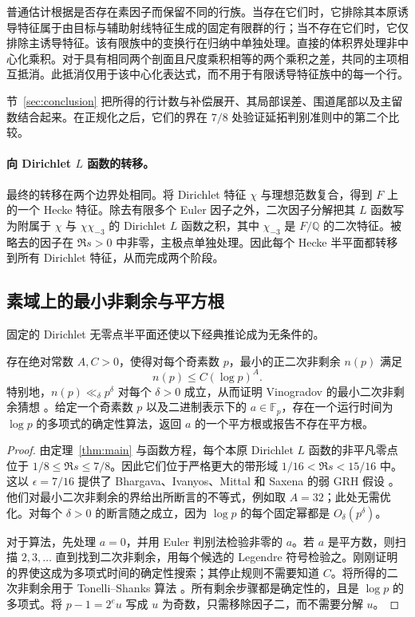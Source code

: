 普通估计根据是否存在素因子而保留不同的行族。当存在它们时，它排除其本原诱导特征属于由目标与辅助射线特征生成的固定有限群的行；当不存在它们时，它仅排除主诱导特征。该有限族中的变换行在归纳中单独处理。直接的体积界处理非中心化乘积。对于具有相同两个剖面且尺度乘积相等的两个乘积之差，共同的主项相互抵消。此抵消仅用于该中心化表达式，而不用于有限诱导特征族中的每一个行。

节~\ref{sec:conclusion} 把所得的行计数与补偿展开、其局部误差、围道尾部以及主留数结合起来。在正规化之后，它们的界在 $7/8$ 处验证延拓判别准则中的第二个比较。

\paragraph{向 Dirichlet $L$ 函数的转移。}
最终的转移在两个边界处相同。将 Dirichlet 特征 $\chi$ 与理想范数复合，得到 $F$ 上的一个 Hecke 特征。除去有限多个 Euler 因子之外，二次因子分解把其 $L$ 函数写为附属于 $\chi$ 与 $\chi\chi_{-3}$ 的 Dirichlet $L$ 函数之积，其中 $\chi_{-3}$ 是 $F/\mathbb Q$ 的二次特征。被略去的因子在 $\Re s>0$ 中非零，主极点单独处理。因此每个 Hecke 半平面都转移到所有 Dirichlet 特征，从而完成两个阶段。

\subsection*{素域上的最小非剩余与平方根}

固定的 Dirichlet 无零点半平面还使以下经典推论成为无条件的。

\begin{corollary}\label{cor:nonresidues-square-roots}
存在绝对常数 $A,C>0$，使得对每个奇素数 $p$，最小的正二次非剩余 $n(p)$ 满足
\[
 n(p)\le C(\log p)^A.
\]
特别地，$n(p)\ll_\delta p^\delta$ 对每个 $\delta>0$ 成立，从而证明 Vinogradov 的最小二次非剩余猜想 \cite[猜想 1.1]{TaoNonresidues}。给定一个奇素数 $p$ 以及二进制表示下的 $a\in\mathbb F_p$，存在一个运行时间为 $\log p$ 的多项式的确定性算法，返回 $a$ 的一个平方根或报告不存在平方根。
\end{corollary}

\begin{proof}
由定理~\ref{thm:main} 与函数方程，每个本原 Dirichlet $L$ 函数的非平凡零点位于 $1/8\le\Re s\le7/8$。因此它们位于严格更大的带形域 $1/16<\Re s<15/16$ 中。这以 $\epsilon=7/16$ 提供了 Bhargava、Ivanyos、Mittal 和 Saxena 的弱 GRH 假设 \cite[猜想 6.3 与定理 6.7]{BIMS}。他们对最小二次非剩余的界给出所断言的不等式，例如取 $A=32$；此处无需优化。对每个 $\delta>0$ 的断言随之成立，因为 $\log p$ 的每个固定幂都是 $O_\delta(p^\delta)$。

对于算法，先处理 $a=0$，并用 Euler 判别法检验非零的 $a$。若 $a$ 是平方数，则扫描 $2,3,\ldots$ 直到找到二次非剩余，用每个候选的 Legendre 符号检验之。刚刚证明的界使这成为多项式时间的确定性搜索；其停止规则不需要知道 $C$。将所得的二次非剩余用于 Tonelli--Shanks 算法 \cite[第 2.9 节，算法 3 与引理 2.9.5]{Galbraith}。所有剩余步骤都是确定性的，且是 $\log p$ 的多项式。将 $p-1=2^e u$ 写成 $u$ 为奇数，只需移除因子二，而不需要分解 $u$。
\end{proof}

